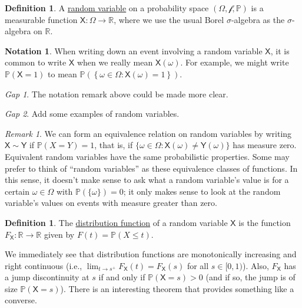 \documentclass[11pt]{article}
\newcommand{\col}[1]{\mathscr{#1}}
\newcommand{\rv}[1]{\mathsf{#1}}
\newcommand{\p}{\mathbb{P}}
\newcommand{\defname}[1]{\underline{#1}}
\newcommand{\RR}{\mathbb{R}}
\theoremstyle{theorem}
\theoremstyle{definition}
\newtheorem{definition}[theorem]{Definition}
\newtheorem{notation}[theorem]{Notation}
\theoremstyle{remark}
\newtheorem*{remark}{Remark}
\theoremstyle{step}
\theoremstyle{gap}
\newtheorem*{gap}{Gap}
\begin{document}
\begin{definition}
A \defname{random variable} on a probability space \((\Omega, \col{f}, \p)\) is a measurable function \(\rv{X}:\Omega \to \RR\), where we use the usual Borel \(\sigma\)-algebra as the \(\sigma\)-algebra on \(\RR\).
\end{definition}

\begin{notation}
When writing down an event involving a random variable \(\rv{X}\), it is common to write \(\rv{X}\) when we really mean \(\rv{X}(\omega)\). For example, we might write \(\p(\rv{X} = 1)\) to mean \(\p\left(\left\{\omega \in \Omega : \rv{X}(\omega) = 1\right\}\right)\).
\end{notation}

\begin{gap}
The notation remark above could be made more clear.
\end{gap}

\begin{gap}
Add some examples of random variables.
\end{gap}

\begin{remark}
We can form an equivalence relation on random variables by writing \(\rv{X} \sim \rv{Y}\) if \(\p(X=Y)=1\), that is, if \(\{\omega \in \Omega : \rv{X}(\omega) \neq \rv{Y}(\omega)\}\) has measure zero. Equivalent random variables have the same probabilistic properties. Some may prefer to think of ``random variables'' as these equivalence classes of functions. In this sense, it doesn't make sense to ask what a random variable's value is for a certain \(\omega \in \Omega\) with \(\p(\{\omega\}) = 0\); it only makes sense to look at the random variable's values on events with measure greater than zero.
\end{remark}

\begin{definition}
The \defname{distribution function} of a random variable \(\rv{X}\) is the function \(F_\rv{X}: \RR \to \RR\) given by \(F(t) = \p(X \leq t)\).
\end{definition}

We immediately see that distribution functions are monotonically increasing and right continuous (i.e., \(\lim_{t\to s^+} F_\rv{X}(t) = F_\rv{X}(s)\) for all \(s \in [0,1)\)). Also, \(F_\rv{X}\) has a jump discontinuity at \(s\) if and only if \(\p(\rv{X} = s) > 0\) (and if so, the jump is of size \(\p(\rv{X} = s)\)). There is an interesting theorem that provides something like a converse.
\end{document}
